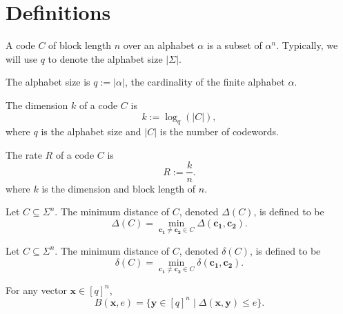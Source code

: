 \section{Definitions}
\begin{definition}[Code]
\label{def:Code}
\leanok
A code $C$ of block length $n$ over an alphabet $\alpha$ is a subset of $\alpha^{n}$.
Typically, we will use $q$ to denote the alphabet size $|\Sigma|$.
\end{definition}

\begin{definition}
    \label{def:q}
    \leanok
    The alphabet size is $q := \lvert\alpha\rvert$, the cardinality of the finite alphabet $\alpha$.
\end{definition}

\begin{definition}[Dimension]
    \label{def:dim}
    \leanok
    The dimension $k$ of a code $C$ is
    \[
        k := \log_{q}(\lvert C\rvert),
    \]
    where $q$ is the alphabet size and $\lvert C\rvert$ is the number of codewords.
\end{definition}

\begin{definition}[Rate]
    \label{def:rate}
    \leanok
    The rate $R$ of a code $C$ is
    \[
        R := \frac{k}{n}.
    \]
    where $k$ is the dimension and block length of $n$.
\end{definition}

\begin{definition}
  \label{def:MinDim}
  \leanok
  Let $C \subseteq \Sigma^{n}$.
  The minimum distance of $C$, denoted $\Delta(C)$, is defined to be
  \[\Delta(C) = \min_{\mathbf{c_{1}} \neq \mathbf{c_{2}} \in C} \Delta(\mathbf{c_{1}}, \mathbf{c_{2}}).\]
\end{definition}

\begin{definition}
  \label{def:RelMinDim}
  \leanok
  Let $C \subseteq \Sigma^{n}$.
  The minimum distance of $C$, denoted $\delta(C)$, is defined to be
  \[\delta(C) = \min_{\mathbf{c_{1}} \neq \mathbf{c_{2}} \in C} \delta(\mathbf{c_{1}}, \mathbf{c_{2}}).\]
\end{definition}

\begin{definition}
  \label{def:HammingBall}
  \leanok
  For any vector $\mathbf{x} \in [q]^{n}$,
  \[B(\mathbf{x},e) = \{\mathbf{y} \in [q]^{n}\mid \Delta(\mathbf{x},\mathbf{y}) \leq e\}.\]
\end{definition}

